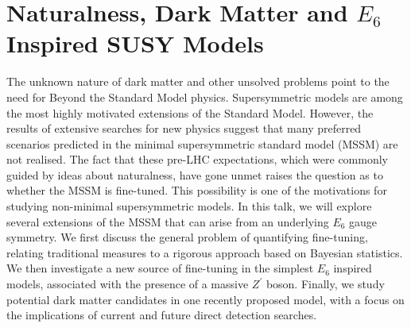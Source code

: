 \documentclass[12pt,a4paper]{article}
\begin{document}
\section{Naturalness, Dark Matter and $E_6$ Inspired SUSY Models}
The unknown nature of dark matter and other unsolved problems point to
the need for Beyond the Standard Model physics. Supersymmetric models are
among the most highly motivated extensions of the Standard Model.  However,
the results of extensive searches for new physics suggest that many
preferred scenarios predicted in the minimal supersymmetric standard
model (MSSM) are not realised.  The fact that these pre-LHC expectations,
which were commonly guided by ideas about naturalness, have gone unmet raises
the question as to whether the MSSM is fine-tuned.  This possibility is
one of the motivations for studying non-minimal supersymmetric models.  In this
talk, we will explore several extensions of the MSSM that can arise from an
underlying $E_6$ gauge symmetry.  We first discuss the general problem of
quantifying fine-tuning, relating traditional measures to a rigorous approach
based on Bayesian statistics.  We then investigate a new source of
fine-tuning in the simplest $E_6$ inspired models, associated with the
presence of a massive $Z^\prime$ boson.  Finally, we study potential dark
matter candidates in one recently proposed model, with a focus on the
implications of current and future direct detection searches.
\end{document}
